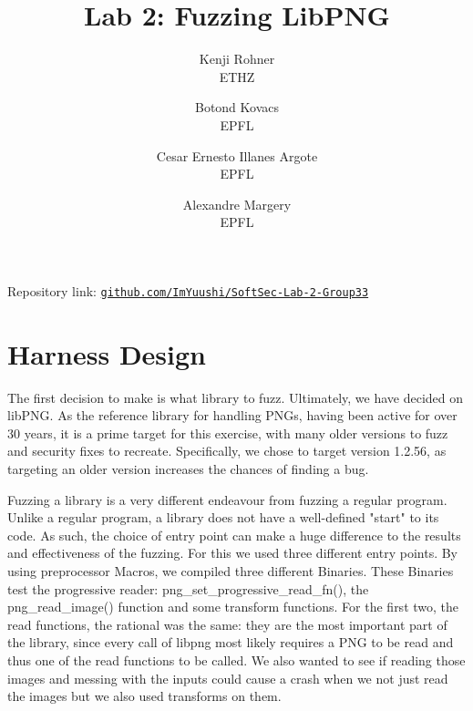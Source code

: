 \documentclass[letterpaper,twocolumn,10pt]{article}
\begin{document}

\date{}

\title{\Large \bf Lab 2: Fuzzing LibPNG}

\author{
{\rm Kenji Rohner}\\
ETHZ
\and
{\rm Botond Kovacs}\\
EPFL
\and
{\rm Cesar Ernesto Illanes Argote}\\
EPFL
\and
{\rm Alexandre Margery}\\
EPFL
} %

\maketitle

\vspace{-1.5em}
\begin{center}
{\scriptsize Repository link: \href{https://github.com/ImYuushi/SoftSec-Lab-2-Group33}{\texttt{github.com/ImYuushi/SoftSec-Lab-2-Group33}}}
\end{center}
\vspace{-1em}

\section{Harness Design}

The first decision to make is what library to fuzz. Ultimately, we have decided on libPNG. As the reference library for handling PNGs, having been active for over 30 years, it is a prime target for this exercise, with many older versions to fuzz and security fixes to recreate. Specifically, we chose to target version 1.2.56, as targeting an older version increases the chances of finding a bug.

Fuzzing a library is a very different endeavour from fuzzing a regular program. Unlike a regular program, a library does not have a well-defined "start" to its code. As such, the choice of entry point can make a huge difference to the results and effectiveness of the fuzzing. For this we used three different entry points. By using preprocessor Macros, we compiled three different Binaries. These Binaries test the progressive reader: png\_set\_progressive\_read\_fn(), the png\_read\_image() function and some transform functions. For the first two, the read functions, the rational was the same: they are the most important part of the library, since every call of libpng most likely requires a PNG to be read and thus one of the read functions to be called. We also wanted to see if reading those images and messing with the inputs could cause a crash when we not just read the images but we also used transforms on them.
\end{document}
